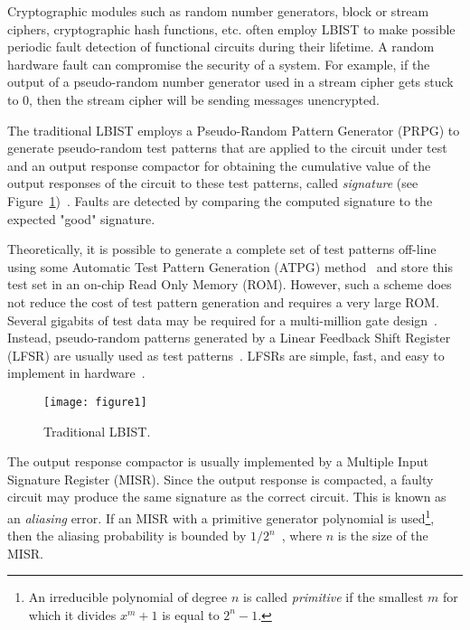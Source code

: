 \documentclass[a4paper]{llncs}
\begin{document}
Cryptographic modules such as random number generators, block or stream ciphers, cryptographic hash functions, etc. often employ LBIST to make possible periodic fault detection of functional circuits during their lifetime. A random hardware fault can compromise the security of a system. For example, if the output of a pseudo-random number generator used in a stream cipher gets stuck to 0, then the stream cipher will be sending messages unencrypted.

The traditional LBIST employs a Pseudo-Random Pattern Generator (PRPG) 
to generate pseudo-random test patterns that are applied to the circuit under test and an output response compactor for obtaining the cumulative value of the output responses of the circuit to these test patterns, called {\em signature} (see Figure~\ref{f1})~\cite{LiCDP15}. Faults are detected by comparing the computed signature to the expected "good" signature.

Theoretically, it is possible to generate a complete set of test patterns off-line using some Automatic Test
Pattern Generation (ATPG) method~\cite{atpg} and store this test set in an on-chip Read Only Memory (ROM). However, such a
scheme does not reduce the cost of test pattern generation and requires a very large ROM. Several gigabits of
test data may be required for a multi-million gate design~\cite{HeF99}. 
Instead, pseudo-random patterns generated by
a Linear Feedback Shift Register (LFSR) are usually used as test patterns~\cite{McMMW88}. 
LFSRs are simple, fast, and easy to implement in hardware~\cite{Golomb_book}.

\begin{figure}[t!]
\begin{center}
\texttt{[image: figure1]}
\caption{Traditional LBIST.}\label{f1} 
\end{center}
\end{figure}

The output response compactor is usually implemented by a  
Multiple Input Signature Register  (MISR). Since the output response is compacted, a faulty circuit may produce the same signature as the correct circuit. This is known as an {\em aliasing} error. If an MISR with a primitive generator polynomial is used\footnote{An irreducible polynomial of degree $n$ is called {\em primitive} if the smallest $m$ for which it divides $x^m+1$ is equal to $2^n-1$\cite{Golomb_book}.}, then the aliasing probability is bounded by $1/2^n$~\cite{DaOFE90}, where $n$ is the size of the MISR. 
\end{document}
